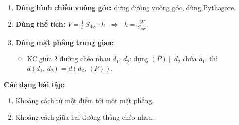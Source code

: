 \documentclass[12pt,a4paper]{article}
\begin{document}
\begin{phuongphap}[title={Các cách tính khoảng cách}]
  \begin{enumerate}
    \item \textbf{Dùng hình chiếu vuông góc:} dựng đường vuông góc, dùng Pythagore.
    \item \textbf{Dùng thể tích:} $V = \frac{1}{3}\,S_{\text{đáy}} \cdot h$ $\;\Rightarrow\;$ $h = \frac{3V}{S_{\text{đáy}}}$.
    \item \textbf{Dùng mặt phẳng trung gian:}
      \begin{itemize}
        \item KC giữa 2 đường chéo nhau $d_1$, $d_2$: dựng $(P) \parallel d_2$ chứa $d_1$, thì $d(d_1,\,d_2) = d(d_2,\,(P))$.
      \end{itemize}
  \end{enumerate}
\end{phuongphap}

\medskip\noindent\textbf{Các dạng bài tập:}
\begin{enumerate}[label=\textbf{Dạng \arabic*:}, leftmargin=*, align=left]
  \item Khoảng cách từ một điểm tới một mặt phẳng.
  \item Khoảng cách giữa hai đường thẳng chéo nhau.
\end{enumerate}
\end{document}
